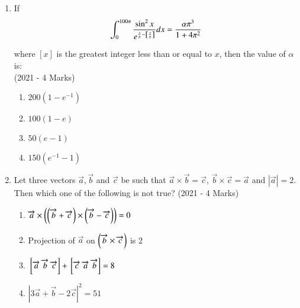 \documentclass[journal]{IEEEtran}
\begin{document}
\begin{enumerate}
{        	\begin{multicols}{4}
        		\begin{enumerate}
					\item -42
					
					\item -40
					
					\item -29
					\item -38
        		\end{enumerate}
        	\end{multicols}
        	
        }
 	\item{
			If  $$\int_0^{100\pi} \frac{\sin^2 x}{e^{\frac{x}{\pi} - {}\left[\frac{x}{\pi}\right]}} dx = \frac{\alpha \pi^3}{1+ 4\pi^2}$$
			
			where $[x]$ is the greatest integer less than or equal to $x$, then the value of $\alpha$ is:
			\\ \text{ }
			\hfill
			{(2021 - 4 Marks)}
			
			\begin{multicols}{4}
				\begin{enumerate}
					\item $200(1 - e ^{-1})$
					\item $100(1 - e)$
					\item $50(e - 1)$
					\item $150(e^{-1} - 1)$
				\end{enumerate}
			\end{multicols}
			
		}
 	\item{
			Let three vectors $\overrightarrow{a},\overrightarrow{b}$ and $\overrightarrow{c}$ be such that $\overrightarrow{a} \times \overrightarrow{b} = \overrightarrow{c}$, $\overrightarrow{b} \times \overrightarrow{c} =\overrightarrow{a}$ and $|\overrightarrow{a}| = 2$. Then which one of the following is not true?\text{ }
			\hfill
			{(2021 - 4 Marks)}
			
			\begin{multicols}{2}
				\begin{enumerate}
					\item $\overrightarrow{a}\times\left(\left(\overrightarrow{b}+\overrightarrow{c}\right)\times\left(\overrightarrow{b}-\overrightarrow{c}\right)\right) = 0$
					\item Projection of $\overrightarrow{a}$ on $\left(\overrightarrow{b}\times\overrightarrow{c}\right)$ is 2
					\item ${}\left[\overrightarrow{a}\text{ }\overrightarrow{b}\text{ }\overrightarrow{c}\right]+{}\left[\overrightarrow{c}\text{ }\overrightarrow{a}\text{ }\overrightarrow{b}\right] =8$
					\item $|3\overrightarrow{a}+\overrightarrow{b}  -2\overrightarrow{c}|^2 = 51$
				\end{enumerate}
			\end{multicols}
			
}
\end{enumerate}
\end{document}
